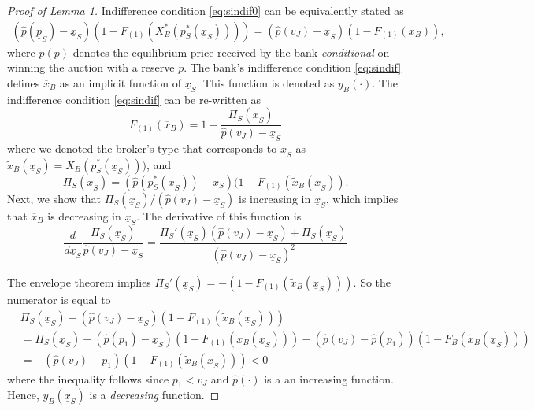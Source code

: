 \documentclass[11pt,twopage]{article}
\newcommand{\ol}{\overline}
\begin{document}
\begin{proof}[Proof of Lemma 1] Indifference condition
  \eqref{eq:sindif0} can be equivalently stated as
  \begin{align}
    (\hat p(\underline p_S) - \underline
    x_S)(1-F_{(1)}(X_B^*(p_S^*(\underline x_S)))) = (\hat p(v_J) -
    \underline x_S)(1-F_{(1)}(\overline x_B)), \label{eq:sindif}
  \end{align}
  where $\hat p(p)$ denotes the equilibrium price received by the bank
  \emph{conditional} on winning the auction with a reserve $p$.
  The bank's indifference condition \eqref{eq:sindif} defines $\ol
  x_B$ as an implicit function of $\underline x_S$.
  This function is denoted as $y_B(\cdot)$.  The indifference
  condition \eqref{eq:sindif} can be re-written as
  \[
  F_{(1)}(\ol x_B)=1-\frac{\Pi_S(\underline x_S)}{\hat
    p(v_J)-\underline x_S}
  \]
  where we denoted the broker's type that corresponds to $\underline
  x_S$ as $\tilde x_B(\underline x_S) =X_B(p_S^*(\underline x_S)))$,
  and
  \[ \Pi_S(\underline x_S) = (\hat p(p_S^*(\underline
  x_S))-x_S)(1-F_{(1)}(\tilde x_B(\underline x_S)) .\] Next, we show
  that $\Pi_S(\underline x_S)/(\hat p(v_J)-\underline x_S)$ is
  increasing in $\underline x_S$, which implies that $\ol x_B$ is
  decreasing in $\underline x_S$. The derivative of this function is
  \[
  \frac{d}{d\underline x_S} \frac{\Pi_S(\underline x_S)}{\hat
    p(v_J)-\underline x_S} = \frac{\Pi_S'(\underline x_S)(\hat
    p(v_J)-\underline x_S)+\Pi_S(\underline x_S)}{(\hat
    p(v_J)-\underline x_S)^2}
  \]

  The envelope theorem implies $\Pi_S'(\underline x_S) =
  -(1-F_{(1)}(\tilde x_B(\underline x_S)))$. So the numerator is equal
  to
  \begin{align*}
    &  \Pi_S(\underline x_S)-(\hat p(v_J)-\underline x_S)(1-F_{(1)}(\tilde x_B(\underline x_S))) \\
    & = \Pi_S(\underline x_S)-(\hat p(p_1)-\underline
    x_S)(1-F_{(1)}(\tilde x_B(\underline x_S))) - (\hat p(v_J)-\hat
    p(p_1))(1-F_B(\tilde x_B(\underline x_S)))
    \\
    & = -(\hat p(v_J)-p_1)(1-F_{(1)}(\tilde x_B(\underline x_S))) < 0
  \end{align*}
  where the inequality follows since $p_1<v_J$ and $\hat p(\cdot)$ is
  a an increasing function. Hence, $y_B(\underline x_S)$ is a
  \emph{decreasing} function.



\end{proof}
\end{document}
